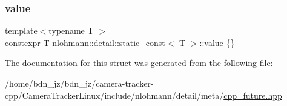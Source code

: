 \subsubsection{\texorpdfstring{value}{value}}
{\footnotesize\ttfamily template$<$typename T $>$ \\
constexpr T \hyperlink{structnlohmann_1_1detail_1_1static__const}{nlohmann\+::detail\+::static\+\_\+const}$<$ T $>$\+::value \{\}\hspace{0.3cm}{\ttfamily [static]}}



The documentation for this struct was generated from the following file\+:\begin{DoxyCompactItemize}
\item 
/home/bdn\+\_\+jz/bdn\+\_\+jz/camera-\/tracker-\/cpp/\+Camera\+Tracker\+Linux/include/nlohmann/detail/meta/\hyperlink{cpp__future_8hpp}{cpp\+\_\+future.\+hpp}\end{DoxyCompactItemize}
